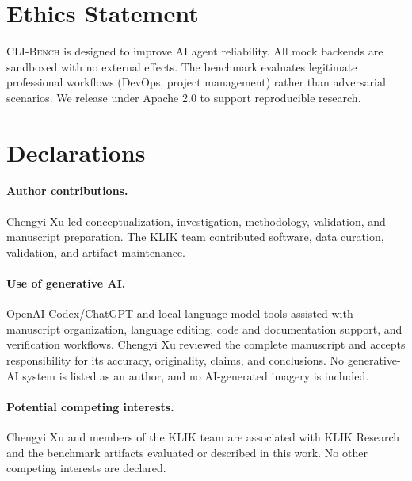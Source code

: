 \documentclass{article}
\newcommand{\clibench}{\textsc{CLI-Bench}}
\begin{document}
\section*{Ethics Statement}

\clibench{} is designed to improve AI agent reliability. All mock backends are sandboxed with no external effects. The benchmark evaluates legitimate professional workflows (DevOps, project management) rather than adversarial scenarios. We release under Apache 2.0 to support reproducible research.

\section*{Declarations}
\paragraph{Author contributions.} Chengyi Xu led conceptualization, investigation, methodology, validation, and manuscript preparation. The KLIK team contributed software, data curation, validation, and artifact maintenance.
\paragraph{Use of generative AI.} OpenAI Codex/ChatGPT and local language-model tools assisted with manuscript organization, language editing, code and documentation support, and verification workflows. Chengyi Xu reviewed the complete manuscript and accepts responsibility for its accuracy, originality, claims, and conclusions. No generative-AI system is listed as an author, and no AI-generated imagery is included.
\paragraph{Potential competing interests.} Chengyi Xu and members of the KLIK team are associated with KLIK Research and the benchmark artifacts evaluated or described in this work. No other competing interests are declared.



\end{document}
